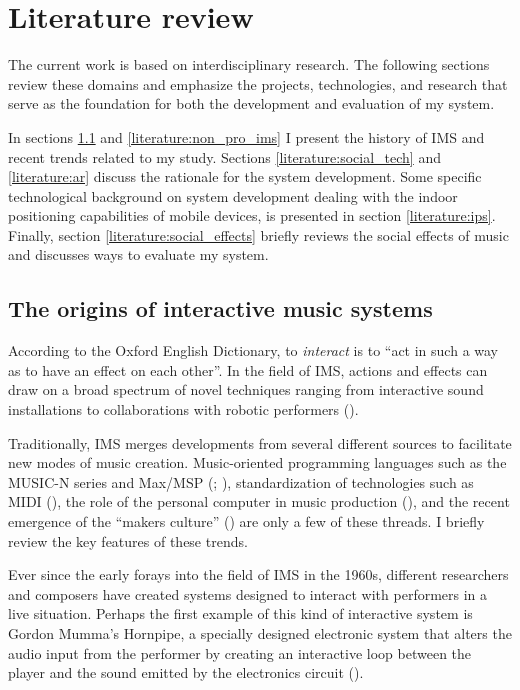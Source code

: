\documentclass[a4paper,11pt]{article}
\begin{document}
\section{Literature review}

The current work is based on interdisciplinary research.
The following sections review these domains and emphasize the projects, technologies, and research that serve as the foundation for both the development and evaluation of my system.

In sections \ref{literature:ims} and \ref{literature:non_pro_ims} I present the history of IMS and recent trends related to my study.
Sections \ref{literature:social_tech} and \ref{literature:ar} discuss the rationale for the system development.
Some specific technological background on system development dealing with the indoor positioning capabilities of mobile devices, is presented in section \ref{literature:ips}.
Finally, section \ref{literature:social_effects} briefly reviews the social effects of music and discusses ways to evaluate my system.

\subsection{The origins of interactive music systems} \label{literature:ims}

According to the Oxford English Dictionary, to \emph{interact} is to ``act in such a way as to have an effect on each other''.
In the field of IMS, actions and effects can draw on a broad spectrum of novel techniques ranging from interactive sound installations to collaborations with robotic performers (\cite{drummond09}).

Traditionally, IMS merges developments from several different sources to facilitate new modes of music creation.
Music-oriented programming languages such as the MUSIC-N series and Max/MSP (\cite{mathews69}; \cite[p. 16]{winkler01}), standardization of technologies such as MIDI (\cite{web:quinn}), the role of the personal computer in music production (\cite{leider:04}), and the recent emergence of the ``makers culture'' (\cite{kuznetsov2010rise}) are only a few of these threads.
I briefly review the key features of these trends.

Ever since the early forays into the field of IMS in the 1960s, different researchers and composers have created systems designed to interact with performers in a live situation.
Perhaps the first example of this kind of interactive system is Gordon Mumma's Hornpipe, a specially designed electronic system that alters the audio input from the performer by creating an interactive loop between the player and the sound emitted by the electronics circuit (\cite[p. 12]{winkler01}).
\end{document}
